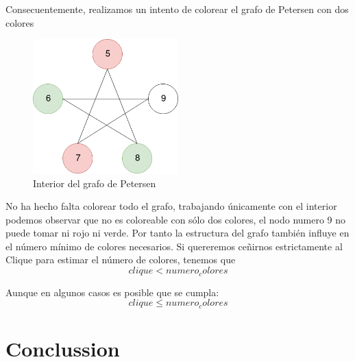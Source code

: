 \documentclass{article}
\begin{document}
Consecuentemente, realizamos un intento de colorear el grafo de Petersen con dos colores 
\begin{figure}[H]
    \centering
    \includegraphics[width=0.5\textwidth]{pictures/interior.png}
    \caption{Interior del grafo de Petersen}
\end{figure}

No ha hecho falta colorear todo el grafo, trabajando únicamente con el interior podemos observar que no es coloreable con sólo dos colores, el nodo
numero 9 no puede tomar ni rojo ni verde.   
Por tanto la estructura del grafo también influye en el número mínimo de colores necesarios. Si quereremos ceñirnos estrictamente al Clique 
para estimar el número de colores, tenemos que 
    \[clique < numero_colores \] 

Aunque en algunos casos es posible que se cumpla: 
    \[clique \leq numero_colores\]

\section{Conclussion}

    
 

\end{document}
